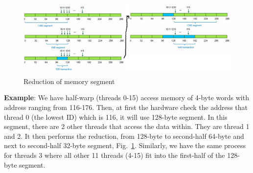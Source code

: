 \begin{figure}[hbt]
  \centerline{\includegraphics[height=4cm,
    angle=0]{./images/segment_reduction.eps}}
  \caption{Reduction of memory segment}
  \label{fig:segment_reduction}
\end{figure}


{\bf Example}: We have half-warp (threads 0-15) access memory of
4-byte words with address ranging from 116-176. Then, at first the
hardware check the address that thread 0 (the lowest ID) which is 116,
it will use 128-byte segment. In this segment, there are 2 other
threads that access the data within. They are thread 1 and 2. It then
performs the reduction, from 128-byte to second-half 64-byte and next
to second-half 32-byte segment,
Fig.~\ref{fig:segment_reduction}. Similarly, we have the same process
for threads 3 where all other 11 threads (4-15) fit into the
first-half of the 128-byte segment.


